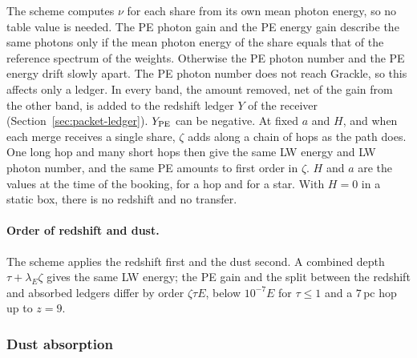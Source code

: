 The scheme computes $\nu$ for each share from its own mean photon energy, so
no table value is needed. The PE photon gain and the PE energy gain describe
the same photons only if the mean photon energy of the share equals that of
the reference spectrum of the weights. Otherwise the PE photon number and the
PE energy drift slowly apart. The PE photon number does not reach Grackle, so
this affects only a ledger. In every
band, the amount removed, net of the gain from the other band, is added to the
redshift ledger $Y$ of the receiver (Section~\ref{sec:packet-ledger}).
$Y_{\rm PE}$ can be negative. At fixed $a$ and $H$, and when each merge receives
a single share, $\zeta$ adds along a chain of hops as the path does. One long
hop and many short hops then give the same LW energy and LW photon number, and
the same PE amounts to first order in $\zeta$. $H$ and $a$ are the values at
the time of the booking, for a hop and for a star. With $H=0$ in a static box,
there is no redshift and no transfer.

\paragraph{Order of redshift and dust.} The scheme applies the redshift first
and the dust second. A combined depth $\tau+\lambda_E\zeta$ gives the same LW
energy; the PE gain and the split between the redshift and absorbed ledgers
differ by order $\zeta\tau E$, below $10^{-7}E$ for $\tau\le1$ and a $7$\,pc
hop up to $z=9$.

\subsubsection{Dust absorption}
\label{sec:packet-absorption}

